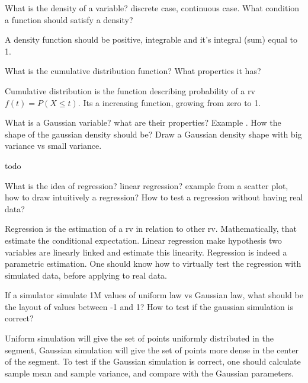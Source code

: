 \documentclass{exam}%
\newcommand*{\ANCOAFINANCE}{}%
\begin{document}
\begin{questions}
\question What is the density of a variable? discrete case, continuous case. What condition a function should satisfy a density?
\begin{solution}[.2in]
A density function should be positive, integrable and it's integral (sum) equal to 1.
\end{solution}

\question What is the cumulative distribution function? What properties it has?
\begin{solution}[.2in]
Cumulative distribution is the function describing probability of a rv $f(t) = P(X\leq t)$. Its a increasing function, growing from zero to 1.
\end{solution}

\question What is a Gaussian variable? what are their properties? Example . How the shape of the gaussian density should be?  Draw a Gaussian density shape with big variance vs small variance.
\begin{solution}[.2in]
	todo
\end{solution}

\question What is the idea of regression? linear regression? example from a scatter plot, how to draw intuitively a regression? How to test a regression without having real data?
\begin{solution}[.2in]
Regression is the estimation of a rv in relation to other rv. Mathematically, that estimate the conditional expectation. Linear regression make hypothesis two variables are linearly linked and estimate this linearity. Regression is indeed a parametric estimation. One should know how to virtually test the regression with simulated data, before applying to real data.
\end{solution}

\question If a simulator simulate 1M values of uniform law vs Gaussian law, what should be the layout of values between -1 and 1? How to test if the gaussian simulation is correct?
\begin{solution}[.2in]
Uniform simulation will give the set of points uniformly distributed in the segment, Gaussian simulation will give the set of points more dense in the center of the segment. To test if the Gaussian simulation is correct, one should calculate sample mean and sample variance, and compare with the Gaussian parameters.
\end{solution}
\end{questions}
\fi
\ifdefined\ANCOAFINANCE
\newpage
\end{document}
